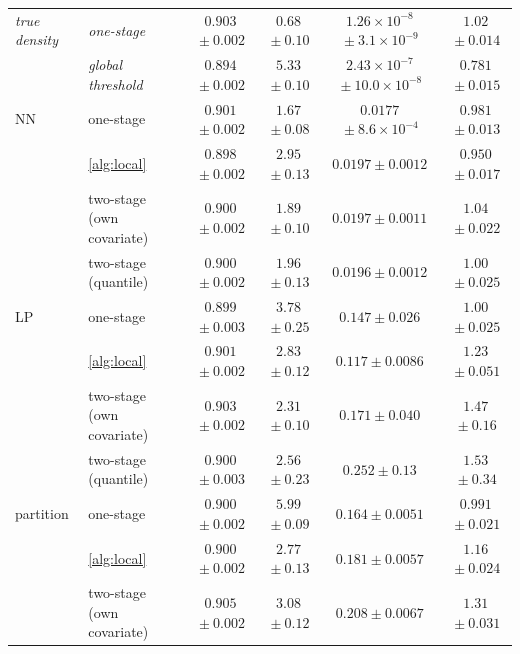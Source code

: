 \begin{table}[!t]
{\begin{tabular}{llcccc}
\textit{true density} & \textit{one-stage} & $0.903${\scriptsize${}\pm0.002$} & $0.68${\scriptsize${}\pm0.10$} & $1.26\times10^{-8}${\scriptsize${}\pm3.1\times10^{-9}$} & $1.02${\scriptsize${}\pm0.014$}\\
 & \textit{global threshold} & $0.894${\scriptsize${}\pm0.002$} & $5.33${\scriptsize${}\pm0.10$} & $2.43\times10^{-7}${\scriptsize${}\pm10.0\times10^{-8}$} & $0.781${\scriptsize${}\pm0.015$}\\
\addlinespace[2pt]
NN & one-stage & $0.901${\scriptsize${}\pm0.002$} & $1.67${\scriptsize${}\pm0.08$} & $0.0177${\scriptsize${}\pm8.6\times10^{-4}$} & $0.981${\scriptsize${}\pm0.013$}\\
 & \cref{alg:local} & $0.898${\scriptsize${}\pm0.002$} & $2.95${\scriptsize${}\pm0.13$} & $0.0197${\scriptsize${}\pm0.0012$} & $0.950${\scriptsize${}\pm0.017$}\\
 & two-stage (own covariate) & $0.900${\scriptsize${}\pm0.002$} & $1.89${\scriptsize${}\pm0.10$} & $0.0197${\scriptsize${}\pm0.0011$} & $1.04${\scriptsize${}\pm0.022$}\\
 & two-stage (quantile) & $0.900${\scriptsize${}\pm0.002$} & $1.96${\scriptsize${}\pm0.13$} & $0.0196${\scriptsize${}\pm0.0012$} & $1.00${\scriptsize${}\pm0.025$}\\
\addlinespace[2pt]
LP & one-stage & $0.899${\scriptsize${}\pm0.003$} & $3.78${\scriptsize${}\pm0.25$} & $0.147${\scriptsize${}\pm0.026$} & $1.00${\scriptsize${}\pm0.025$}\\
 & \cref{alg:local} & $0.901${\scriptsize${}\pm0.002$} & $2.83${\scriptsize${}\pm0.12$} & $0.117${\scriptsize${}\pm0.0086$} & $1.23${\scriptsize${}\pm0.051$}\\
 & two-stage (own covariate) & $0.903${\scriptsize${}\pm0.002$} & $2.31${\scriptsize${}\pm0.10$} & $0.171${\scriptsize${}\pm0.040$} & $1.47${\scriptsize${}\pm0.16$}\\
 & two-stage (quantile) & $0.900${\scriptsize${}\pm0.003$} & $2.56${\scriptsize${}\pm0.23$} & $0.252${\scriptsize${}\pm0.13$} & $1.53${\scriptsize${}\pm0.34$}\\
\addlinespace[2pt]
partition & one-stage & $0.900${\scriptsize${}\pm0.002$} & $5.99${\scriptsize${}\pm0.09$} & $0.164${\scriptsize${}\pm0.0051$} & $0.991${\scriptsize${}\pm0.021$}\\
 & \cref{alg:local} & $0.900${\scriptsize${}\pm0.002$} & $2.77${\scriptsize${}\pm0.13$} & $0.181${\scriptsize${}\pm0.0057$} & $1.16${\scriptsize${}\pm0.024$}\\
 & two-stage (own covariate) & $0.905${\scriptsize${}\pm0.002$} & $3.08${\scriptsize${}\pm0.12$} & $0.208${\scriptsize${}\pm0.0067$} & $1.31${\scriptsize${}\pm0.031$}\\

\end{tabular}}
\end{table}
